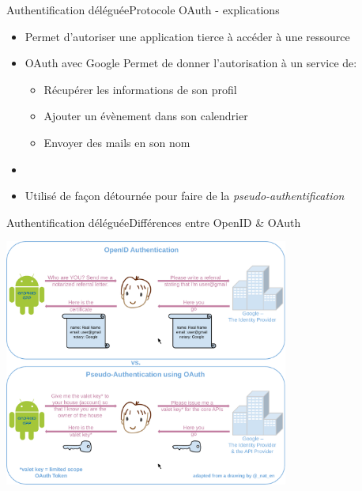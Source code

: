 \documentclass{beamer}
\begin{document}
\begin{frame}{Authentification déléguée}{Protocole OAuth - explications}
  \begin{center}
    \begin{itemize}
      \item Permet d'autoriser une application tierce à accéder à une ressource
      \pause
      \item[~]
      \begin{exampleblock}{OAuth avec Google}
        Permet de donner l'autorisation à un service de:
        \pause
        \begin{itemize}
          \item Récupérer les informations de son profil
          \pause
          \item Ajouter un évènement dans son calendrier
          \pause
          \item Envoyer des mails en son nom
        \end{itemize}
      \end{exampleblock}
      \pause
      \item[~]
      \item Utilisé de façon détournée pour faire de la \emph{pseudo-authentification}
    \end{itemize}
  \end{center}
\end{frame}

\begin{frame}{Authentification déléguée}{Différences entre OpenID \& OAuth }
  \begin{center}
    \includegraphics[width=0.70\textwidth]{img/OpenIDvsPseudo-AuthenticationusingOAuth}
  \end{center}
\end{frame}
\end{document}
